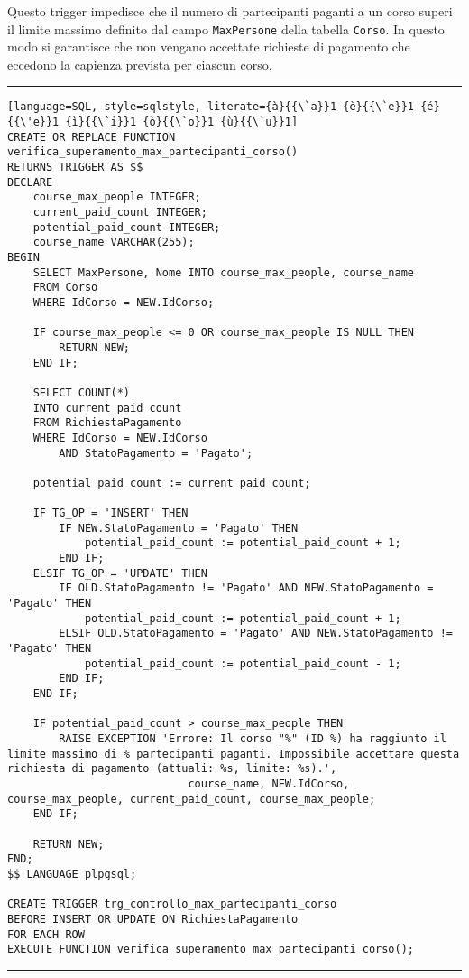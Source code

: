 Questo trigger impedisce che il numero di partecipanti paganti a un corso superi il limite massimo definito dal campo \texttt{MaxPersone} della tabella \texttt{Corso}. In questo modo si garantisce che non vengano accettate richieste di pagamento che eccedono la capienza prevista per ciascun corso.

\noindent\rule{\textwidth}{0.4pt}
\begin{lstlisting}[language=SQL, style=sqlstyle, literate={à}{{\`a}}1 {è}{{\`e}}1 {é}{{\'e}}1 {ì}{{\`i}}1 {ò}{{\`o}}1 {ù}{{\`u}}1]
CREATE OR REPLACE FUNCTION verifica_superamento_max_partecipanti_corso()
RETURNS TRIGGER AS $$
DECLARE
    course_max_people INTEGER;
    current_paid_count INTEGER;
    potential_paid_count INTEGER;
    course_name VARCHAR(255);
BEGIN
    SELECT MaxPersone, Nome INTO course_max_people, course_name
    FROM Corso
    WHERE IdCorso = NEW.IdCorso;

    IF course_max_people <= 0 OR course_max_people IS NULL THEN
        RETURN NEW;
    END IF;

    SELECT COUNT(*)
    INTO current_paid_count
    FROM RichiestaPagamento
    WHERE IdCorso = NEW.IdCorso
        AND StatoPagamento = 'Pagato';

    potential_paid_count := current_paid_count;

    IF TG_OP = 'INSERT' THEN
        IF NEW.StatoPagamento = 'Pagato' THEN
            potential_paid_count := potential_paid_count + 1;
        END IF;
    ELSIF TG_OP = 'UPDATE' THEN
        IF OLD.StatoPagamento != 'Pagato' AND NEW.StatoPagamento = 'Pagato' THEN
            potential_paid_count := potential_paid_count + 1;
        ELSIF OLD.StatoPagamento = 'Pagato' AND NEW.StatoPagamento != 'Pagato' THEN
            potential_paid_count := potential_paid_count - 1;
        END IF;
    END IF;

    IF potential_paid_count > course_max_people THEN
        RAISE EXCEPTION 'Errore: Il corso "%" (ID %) ha raggiunto il limite massimo di % partecipanti paganti. Impossibile accettare questa richiesta di pagamento (attuali: %s, limite: %s).',
                            course_name, NEW.IdCorso, course_max_people, current_paid_count, course_max_people;
    END IF;

    RETURN NEW;
END;
$$ LANGUAGE plpgsql;

CREATE TRIGGER trg_controllo_max_partecipanti_corso
BEFORE INSERT OR UPDATE ON RichiestaPagamento
FOR EACH ROW
EXECUTE FUNCTION verifica_superamento_max_partecipanti_corso();
\end{lstlisting}
\noindent\rule{\textwidth}{0.4pt}

